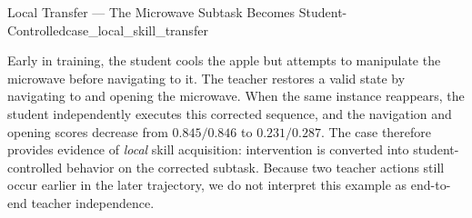 \begin{case}{Local Transfer --- The Microwave Subtask Becomes Student-Controlled}{case_local_skill_transfer}
\vspace{0.6em}
\begin{ageanalysisbox}
\footnotesize
Early in training, the student cools the apple but attempts to manipulate the microwave before navigating to it. 
The teacher restores a valid state by navigating to and opening the microwave. 
When the same instance reappears, the student independently executes this corrected sequence, and the navigation and opening scores decrease from $0.845/0.846$ to $0.231/0.287$. 
The case therefore provides evidence of \emph{local} skill acquisition: intervention is converted into student-controlled behavior on the corrected subtask. 
Because two teacher actions still occur earlier in the later trajectory, we do not interpret this example as end-to-end teacher independence.
\end{ageanalysisbox}
\end{case}

